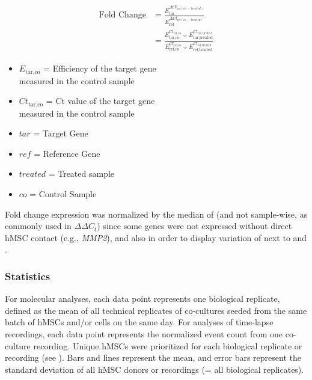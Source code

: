 \begin{minipage}{0.5\textwidth}
    \begin{align*}
        \text{Fold Change} & = \frac{E_{\text{tar}}^{\Delta Ct_{\text{tar} (co\ -\ treated)}}}{E_{\text{ref}}^{\Delta Ct_{\text{ref} (co\ -\ treated)}}}                                                                         \\
                           & = \frac{E_{\text{tar,co}}^{Ct_{\text{tar,co}}} \div E_{\text{tar,treated}}^{Ct_{\text{tar,treated}}}}{E_{\text{ref,co}}^{Ct_{\text{ref,co}}} \div E_{\text{ref,treated}}^{Ct_{\text{ref,treated}}}}
    \end{align*}
\end{minipage}
\begin{minipage}{0.5\textwidth}
    \footnotesize
    \begin{itemize}
        \item $E_{\text{tar,co}}$ = Efficiency of the target gene \\measured in the control sample
        \item $Ct_{\text{tar,co}}$ = Ct value of the target gene \\measured in the control sample
        \item $tar$ = Target Gene
        \item $ref$ = Reference Gene
        \item $treated$ = Treated sample
        \item $co$ = Control Sample
    \end{itemize}
\end{minipage}

Fold change expression was normalized by the median of \CMina (and not
sample-wise, as commonly used in $\Delta\Delta C_t$) since some genes were
not expressed without direct hMSC contact (e.g., \textit{MMP2}), and also in
order to display variation of \CMina next to \nMAina and \MAina.



\subsubsection*{Statistics}
For molecular analyses, each data point represents one biological replicate,
defined as the mean of all technical replicates of co-cultures seeded from the
same batch of hMSCs and/or \INA cells on the same day. For analyses of
time-lapse recordings, each data point represents the normalized event count
from one co-culture recording. Unique hMSCs were prioritized for each biological
replicate or recording (see ). Bars and lines represent the
mean, and error bars represent the standard deviation of all hMSC donors or
recordings (= all biological replicates).

